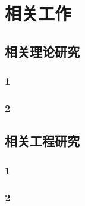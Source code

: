 
\chapter{相关工作}

\section{相关理论研究}

\subsection{1}

\subsection{2}


\section{相关工程研究}

\subsection{1}

\subsection{2}